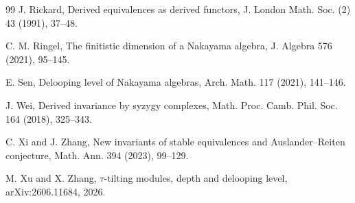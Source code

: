 \documentclass[12pt,a4paper,reqno]{amsart}
\theoremstyle{plain}
\theoremstyle{definition}
\theoremstyle{remark}
\begin{document}
\begin{thebibliography}{99}
 J. Rickard, Derived equivalences as derived functors, J. London Math. Soc. (2) 43 (1991), 37--48.

 C. M. Ringel, The finitistic dimension of a Nakayama algebra, J. Algebra 576 (2021), 95--145.

 E. Sen, Delooping level of Nakayama algebras, Arch. Math. 117 (2021), 141--146.

 J. Wei, Derived invariance by syzygy complexes, Math. Proc. Camb. Phil. Soc. 164 (2018), 325--343.

 C. Xi and J. Zhang, New invariants of stable equivalences and Auslander--Reiten conjecture, Math. Ann. 394 (2023), 99--129.

 M. Xu and X. Zhang, $\tau$-tilting modules, depth and delooping level, arXiv:2606.11684, 2026.

\end{thebibliography}
\end{document}
